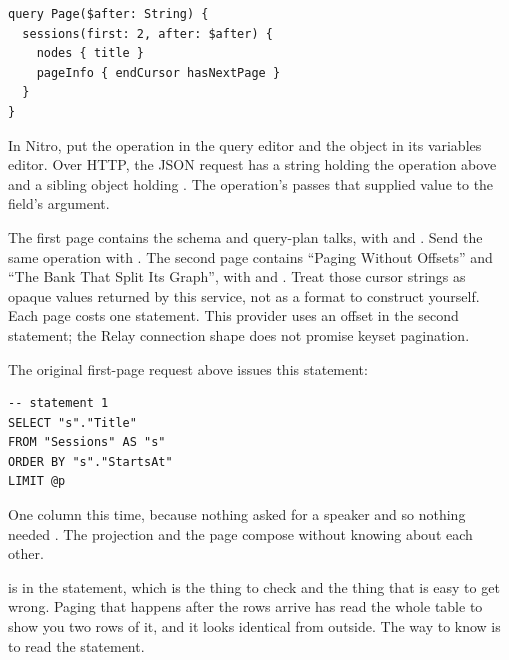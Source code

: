 \begin{verbatim}
query Page($after: String) {
  sessions(first: 2, after: $after) {
    nodes { title }
    pageInfo { endCursor hasNextPage }
  }
}
\end{verbatim}

In Nitro, put the operation in the query editor and the object in its
variables editor. Over HTTP, the JSON request has a  string
holding the operation above and a sibling  object holding
. The operation's  passes
that supplied value to the field's  argument.

The first page contains the schema and query-plan talks, with
 and . Send the same operation
with . The second page contains
\enquote{Paging Without Offsets} and \enquote{The Bank That Split Its Graph},
with  and . Treat those
cursor strings as opaque values returned by this service, not as a format
to construct yourself. Each page costs one statement. This provider uses
an offset in the second statement; the Relay connection shape does not
promise keyset pagination.

The original first-page request above issues this statement:

\begin{verbatim}
-- statement 1
SELECT "s"."Title"
FROM "Sessions" AS "s"
ORDER BY "s"."StartsAt"
LIMIT @p
\end{verbatim}

One column this time, because nothing asked for a speaker and so nothing
needed . The projection and the page compose without knowing
about each other.

%
 is in the statement, which is the thing to check and the thing
that is easy to get wrong. Paging that happens after the rows arrive has read
the whole table to show you two rows of it, and it looks identical from
outside. The way to know is to read the statement.

